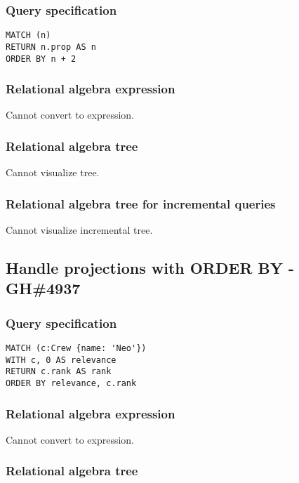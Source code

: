 \subsubsection*{Query specification}

\begin{lstlisting}
MATCH (n)
RETURN n.prop AS n
ORDER BY n + 2
\end{lstlisting}

\subsubsection*{Relational algebra expression}

Cannot convert to expression.

\subsubsection*{Relational algebra tree}

Cannot visualize tree.

\subsubsection*{Relational algebra tree for incremental queries}

Cannot visualize incremental tree.

\subsection{Handle projections with ORDER BY - GH\#4937}

\subsubsection*{Query specification}

\begin{lstlisting}
MATCH (c:Crew {name: 'Neo'})
WITH c, 0 AS relevance
RETURN c.rank AS rank
ORDER BY relevance, c.rank
\end{lstlisting}

\subsubsection*{Relational algebra expression}

Cannot convert to expression.

\subsubsection*{Relational algebra tree}

